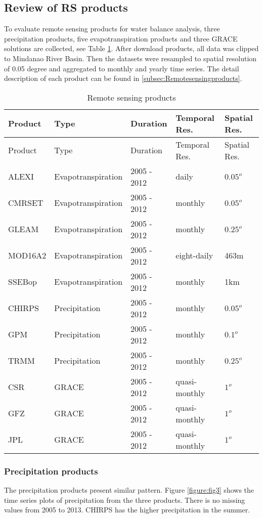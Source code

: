 \documentclass{article}%
\begin{document}
\subsection{Review of RS products}%
\label{subsec:ReviewofRSproducts}%
To evaluate remote sensing products for water balance analysis, three precipitation products, five evapotranspiration products and three GRACE solutions are collected, see Table \ref{table:tab1}. After download products, all data was clipped to Mindanao River Basin. Then the datasets were resampled to spatial resolution of 0.05 degree and aggregated to monthly and yearly time series. The detail description of each product can be found in \ref{subsec:Remotesensingproducts}.%
\linebreak%
\begin{longtable}{|l|l|l|l|l|}%
\caption{Remote sensing products}%
\label{table:tab1}\\%
\hline%
\textbf{Product}&\textbf{Type}&\textbf{Duration}&\textbf{Temporal Res.}&\textbf{Spatial Res.}\\%
\hline%
\endfirsthead%
\hline%
Product&Type&Duration&Temporal Res.&Spatial Res.\\%
\hline%
\endhead%
\hline%
\endfoot%
ALEXI&Evapotranspiration&2005 - 2012&daily&$0.05^{o}$\\%
CMRSET&Evapotranspiration&2005 - 2012&monthly&$0.05^{o}$\\%
GLEAM&Evapotranspiration&2005 - 2012&monthly&$0.25^{o}$\\%
MOD16A2&Evapotranspiration&2005 - 2012&eight-daily&463m\\%
SSEBop&Evapotranspiration&2005 - 2012&monthly&1km\\%
CHIRPS&Precipitation&2005 - 2012&monthly&$0.05^{o}$\\%
GPM&Precipitation&2005 - 2012&monthly&$0.1^{o}$\\%
TRMM&Precipitation&2005 - 2012&monthly&$0.25^{o}$\\%
CSR&GRACE&2005 - 2012&quasi-monthly&$1^{o}$\\%
GFZ&GRACE&2005 - 2012&quasi-monthly&$1^{o}$\\%
JPL&GRACE&2005 - 2012&quasi-monthly&$1^{o}$\\%
\end{longtable}%
\subsubsection{Precipitation products}%
\label{ssubsec:Precipitationproducts}%
The precipitation products present similar pattern. Figure \ref{figure:fig3} shows the time series plots of precipitation from the three products. There is no missing values from 2005 to 2013. CHIRPS has the higher precipitation in the summer.%
\linebreak%
\end{document}
